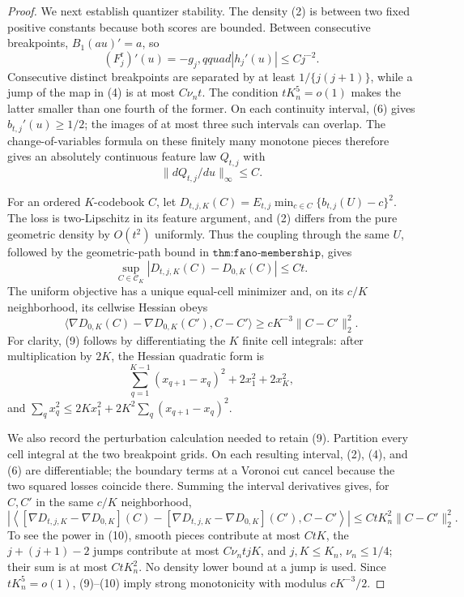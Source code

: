 \documentclass{article}
\begin{document}
\begin{proof}
We next establish quantizer stability.  The density (2) is between two fixed positive constants because both scores are bounded.  Between consecutive breakpoints, \(B_1(au)'=a\), so
\[
 (F_j^{\mathrm r})'(u)=-g_j,qquad |h_j'(u)|\leq Cj^{-2}.                  \tag{6}
\]
Consecutive distinct breakpoints are separated by at least \(1/\{j(j+1)\}\), while a jump of the map in (4) is at most \(C\nu_nt\).  The condition \(tK_n^5=o(1)\) makes the latter smaller than one fourth of the former.  On each continuity interval, (6) gives \(b_{t,j}'(u)\geq1/2\); the images of at most three such intervals can overlap.  The change-of-variables formula on these finitely many monotone pieces therefore gives an absolutely continuous feature law \(Q_{t,j}\) with
\[
 \|dQ_{t,j}/du\|_\infty\leq C.                                          \tag{7}
\]

For an ordered \(K\)-codebook \(C\), let \(D_{t,j,K}(C)=E_{t,j}\min_{c\in C}\{b_{t,j}(U)-c\}^2\).  The loss is two-Lipschitz in its feature argument, and (2) differs from the pure geometric density by \(O(t^2)\) uniformly.  Thus the coupling through the same \(U\), followed by the geometric-path bound in \(\texttt{thm:fano-membership}\), gives
\[
 \sup_{C\in\mathcal C_K}|D_{t,j,K}(C)-D_{0,K}(C)|\leq Ct.                \tag{8}
\]
The uniform objective has a unique equal-cell minimizer and, on its \(c/K\) neighborhood, its cellwise Hessian obeys
\[
 \langle\nabla D_{0,K}(C)-\nabla D_{0,K}(C'),C-C'\rangle
 \geq cK^{-3}\|C-C'\|_2^2.                                              \tag{9}
\]
For clarity, (9) follows by differentiating the \(K\) finite cell integrals: after multiplication by \(2K\), the Hessian quadratic form is
\[
 \sum_{q=1}^{K-1}(x_{q+1}-x_q)^2+2x_1^2+2x_K^2,
\]
and \(\sum_qx_q^2\leq2Kx_1^2+2K^2\sum_q(x_{q+1}-x_q)^2\).

We also record the perturbation calculation needed to retain (9).  Partition every cell integral at the two breakpoint grids.  On each resulting interval, (2), (4), and (6) are differentiable; the boundary terms at a Voronoi cut cancel because the two squared losses coincide there.  Summing the interval derivatives gives, for \(C,C'\) in the same \(c/K\) neighborhood,
\[
 \left|\left\langle
 [\nabla D_{t,j,K}-\nabla D_{0,K}](C)
 -[\nabla D_{t,j,K}-\nabla D_{0,K}](C'),C-C'\right\rangle\right|
 \leq CtK_n^2\|C-C'\|_2^2.                                               \tag{10}
\]
To see the power in (10), smooth pieces contribute at most \(CtK\), the \(j+(j+1)-2\) jumps contribute at most \(C\nu_ntjK\), and \(j,K\leq K_n\), \(\nu_n\leq1/4\); their sum is at most \(CtK_n^2\).  No density lower bound at a jump is used.  Since \(tK_n^5=o(1)\), (9)--(10) imply strong monotonicity with modulus \(cK^{-3}/2\).


\end{proof}
\end{document}
